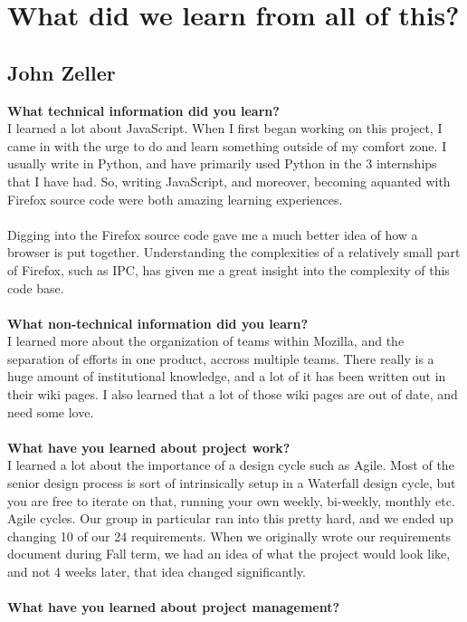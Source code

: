 \documentclass[12pt]{article}
\begin{document}
\section{What did we learn from all of this?}
\subsection{John Zeller}
\textbf{What technical information did you learn?}\\
I learned a lot about JavaScript. When I first began working on this project, I came in with the urge to do and learn something outside of my comfort zone. I usually write in Python, and have primarily used Python in the 3 internships that I have had. So, writing JavaScript, and moreover, becoming aquanted with Firefox source code were both amazing learning experiences.
\\\\
Digging into the Firefox source code gave me a much better idea of how a browser is put together. Understanding the complexities of a relatively small part of Firefox, such as IPC, has given me a great insight into the complexity of this code base.
\\\\
\textbf{What non-technical information did you learn?}\\
I learned more about the organization of teams within Mozilla, and the separation of efforts in one product, accross multiple teams. There really is a huge amount of institutional knowledge, and a lot of it has been written out in their wiki pages. I also learned that a lot of those wiki pages are out of date, and need some love.
\\\\
\textbf{What have you learned about project work?}\\
I learned a lot about the importance of a design cycle such as Agile. Most of the senior design process is sort of intrinsically setup in a Waterfall design cycle, but you are free to iterate on that, running your own weekly, bi-weekly, monthly etc. Agile cycles. Our group in particular ran into this pretty hard, and we ended up changing 10 of our 24 requirements. When we originally wrote our requirements document during Fall term, we had an idea of what the project would look like, and not 4 weeks later, that idea changed significantly.
\\\\
\textbf{What have you learned about project management?}\\
\end{document}
